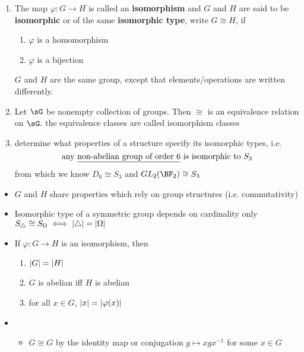 \documentclass[11pt]{article}
\begin{document}
\begin{definition*}
    \begin{enumerate}
        \item {} The map $\varphi:G\to H$ is called an \textbf{isomorphism} and $G$ and $H$ are said to be \textbf{isomorphic} or of the same \textbf{isomorphic type}, write $G\cong H$, if 
        \begin{enumerate}
            \item $\varphi$ is a homomorphism
            \item $\varphi$ is a bijection
        \end{enumerate}
        $G$ and $H$ are the same group, except that elements/operations are written differently.
        \item {} Let $\sG$ be nonempty collection of groups. Then $\cong$ is an equivalence relation on $\sG$. the equivalence classes are called isomorphism classes
        \item {} determine what properties of a structure specify its isomorphic types, i.e.
        \[
            \text{any \underline{non-abelian group of order 6} is isomorphic to $S_3$}    
        \]
        from which we know $D_6 \cong S_3$ and $GL_2(\BF_2) \cong S_3$
    \end{enumerate}
    \begin{itemize}
        \item {} $G$ and $H$ share properties which rely on group structures (i.e. commutativity)
        \item {} Isomorphic type of a symmetric group depends on cardinality only $S_{\triangle} \cong S_{\Omega} \iff \left|\triangle\right| = \left|\Omega\right|$
        \item {} If $\varphi: G\to H$ is an isomorphism, then 
        \begin{enumerate}
            \item $\left|G\right| = \left|H\right|$
            \item $G$ is abelian iff $H$ is abelian
            \item for all $x\in G$, $\left|x\right| = \left|\varphi (x)\right|$
        \end{enumerate}
        \item {}
        \begin{itemize}
            \item $G\cong G$ by the identity map or conjugation $g \mapsto xgx^{-1}$ for some $x\in G$

\end{itemize}
\end{itemize}
\end{definition*}
\end{document}
